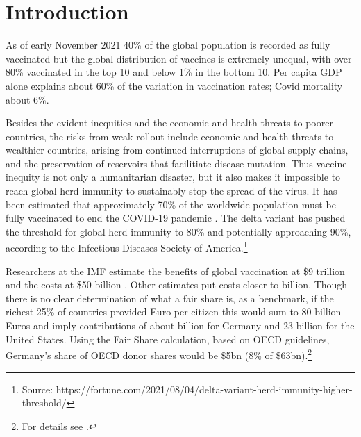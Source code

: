 \documentclass[12pt,oneside,smallheadings,chapterprefix=true]{article}
\begin{document}
\thispagestyle{empty}

\newpage
\doublespacing

\setcounter{page}{1}

\section*{Introduction}

As of early November 2021 40\% of the global population is recorded as fully vaccinated but the global distribution of vaccines is extremely unequal, with over 80\% vaccinated in the top 10 and below 1\% in the bottom 10. Per capita GDP alone explains about 60\% of the variation in vaccination rates; Covid mortality about 6\%.

Besides the evident inequities and the economic and health threats to poorer countries, the risks from weak rollout include economic and health threats to wealthier countries, arising from continued interruptions of global supply chains, and the preservation of reservoirs that facilitiate disease mutation. Thus vaccine inequity is not only a humanitarian disaster, but it also makes it impossible to reach global herd immunity to sustainably stop the spread of the virus. It has been estimated that  approximately 70\% of the worldwide population must be fully vaccinated to end the COVID-19 pandemic \citep{Randolph2020}. The delta variant has pushed the threshold for global herd immunity to  80\% and potentially approaching 90\%, according to the Infectious Diseases Society of America.\footnote{Source:  https://fortune.com/2021/08/04/delta-variant-herd-immunity-higher-threshold/} 

Researchers at the IMF estimate the benefits of global vaccination at \$9 trillion and the costs at \$50 billion \citep{agarwal2021proposal}. Other estimates put costs closer to  billion.  Though there is no clear determination of what a fair share is, as a benchmark, if the richest 25\% of countries provided \texteuro Euro per citizen this would sum to 80 billion Euros and imply contributions of about  billion for Germany and 23 billion for the United States. Using the Fair Share calculation, based on OECD guidelines, Germany's share of OECD donor shares would be \$5bn (8\% of \$63bn).\footnote{For details see \citet{care2021}.}  
\end{document}
